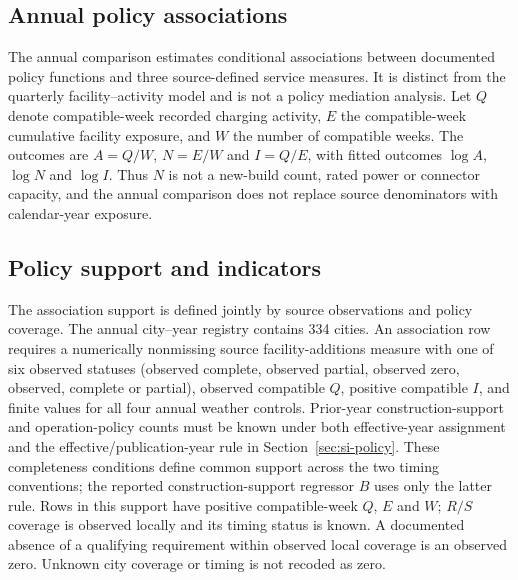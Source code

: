 \subsection{Annual policy associations}
\label{sec:si-annual-policy-associations}

The annual comparison estimates conditional associations between documented
policy functions and three source-defined service measures.  It is distinct
from the quarterly facility--activity model and is not a policy mediation
analysis.  Let $Q$ denote compatible-week recorded charging activity, $E$ the
compatible-week cumulative facility exposure, and $W$ the number of compatible
weeks.  The outcomes are $A=Q/W$, $N=E/W$ and $I=Q/E$, with fitted outcomes
$\log A$, $\log N$ and $\log I$.  Thus $N$ is not a new-build count, rated
power or connector capacity, and the annual comparison does not replace source
denominators with calendar-year exposure.

\subsection{Policy support and indicators}
The association support is defined jointly by source observations and policy
coverage.  The annual city--year registry contains 334 cities.  An association
row requires a numerically nonmissing source facility-additions measure with
one of six observed statuses (observed complete, observed partial, observed
zero, observed, complete or partial), observed compatible $Q$, positive
compatible $I$, and finite values for all four annual weather controls.
Prior-year construction-support and operation-policy counts must be known under
both effective-year assignment and the effective/publication-year rule in
Section~\ref{sec:si-policy}.
These completeness conditions define common support across the two timing conventions;
the reported construction-support regressor $B$ uses only the latter rule.  Rows in this support have positive
compatible-week $Q$, $E$ and $W$; $R/S$ coverage is observed locally and its
timing status is known.  A documented absence of a qualifying requirement
within observed local coverage is an observed zero.  Unknown city coverage or
timing is not recoded as zero.

